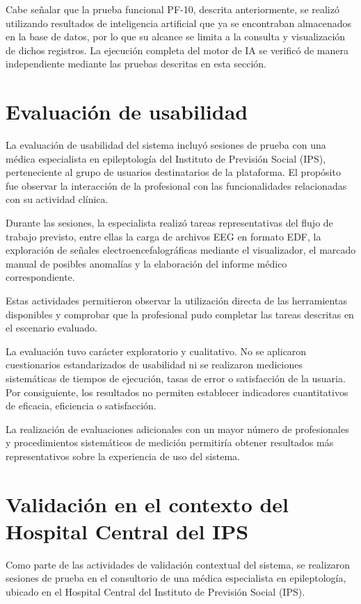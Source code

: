 Cabe señalar que la prueba funcional PF-10, descrita anteriormente, se realizó utilizando resultados de inteligencia artificial que ya se encontraban almacenados en la base de datos, por lo que su alcance se limita a la consulta y visualización de dichos registros. La ejecución completa del motor de IA se verificó de manera independiente mediante las pruebas descritas en esta sección.


\section{Evaluación de usabilidad}


La evaluación de usabilidad del sistema incluyó sesiones de prueba con una médica especialista en epileptología del Instituto de Previsión Social (IPS), perteneciente al grupo de usuarios destinatarios de la plataforma. El propósito fue observar la interacción de la profesional con las funcionalidades relacionadas con su actividad clínica.

Durante las sesiones, la especialista realizó tareas representativas del flujo de trabajo previsto, entre ellas la carga de archivos EEG en formato EDF, la exploración de señales electroencefalográficas mediante el visualizador, el marcado manual de posibles anomalías y la elaboración del informe médico correspondiente.

Estas actividades permitieron observar la utilización directa de las herramientas disponibles y comprobar que la profesional pudo completar las tareas descritas en el escenario evaluado.

La evaluación tuvo carácter exploratorio y cualitativo. No se aplicaron cuestionarios estandarizados de usabilidad ni se realizaron mediciones sistemáticas de tiempos de ejecución, tasas de error o satisfacción de la usuaria. Por consiguiente, los resultados no permiten establecer indicadores cuantitativos de eficacia, eficiencia o satisfacción.

La realización de evaluaciones adicionales con un mayor número de profesionales y procedimientos sistemáticos de medición permitiría obtener resultados más representativos sobre la experiencia de uso del sistema.


\section{Validación en el contexto del Hospital Central del IPS}


Como parte de las actividades de validación contextual del sistema, se realizaron sesiones de prueba en el consultorio de una médica especialista en epileptología, ubicado en el Hospital Central del Instituto de Previsión Social (IPS).

